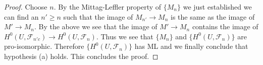 \documentclass[10pt,a4paper]{amsart}
\theoremstyle{plain}
\theoremstyle{definition}
\theoremstyle{remark}
\numberwithin{equation}{subsection}
\begin{document}
\begin{proof}
\medskip\noindent
Choose $n$. By the Mittag-Leffler property of $\{M_n\}$ we just established
we can find an $n' \geq n$ such that the image of $M_{n'} \to M_n$
is the same as the image of $M' \to M_n$. By the above we see that
the image of $M' \to M_n$ contains the image of
$H^0(U, \mathcal{F}_{n'c}) \to H^0(U, \mathcal{F}_n)$.
Thus we see that $\{M_n\}$ and $\{H^0(U, \mathcal{F}_n)\}$
are pro-isomorphic. Therefore $\{H^0(U, \mathcal{F}_n)\}$
has ML and we finally conclude that hypothesis (a) holds.
This concludes the proof.
\end{proof}



\end{document}
